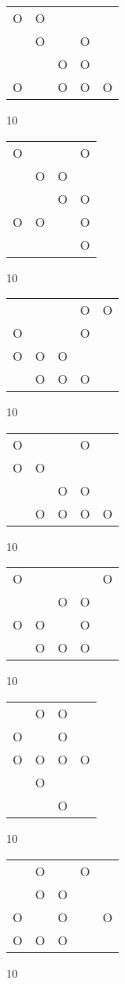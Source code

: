 \begin{tabular}{|m{0.2cm}m{0.2cm}m{0.2cm}m{0.2cm}m{0.2cm}|}\hline
O&O& & & \\
 &O& &O& \\
 & &O&O& \\
O& &O&O&O\\
\hline\end{tabular}10
\begin{tabular}{|m{0.2cm}m{0.2cm}m{0.2cm}m{0.2cm}|}\hline
O& & &O\\
 &O&O& \\
 & &O&O\\
O&O& &O\\
 & & &O\\
\hline\end{tabular}10
\begin{tabular}{|m{0.2cm}m{0.2cm}m{0.2cm}m{0.2cm}m{0.2cm}|}\hline
 & & &O&O\\
O& & &O& \\
O&O&O& & \\
 &O&O&O& \\
\hline\end{tabular}10
\begin{tabular}{|m{0.2cm}m{0.2cm}m{0.2cm}m{0.2cm}m{0.2cm}|}\hline
O& & &O& \\
O&O& & & \\
 & &O&O& \\
 &O&O&O&O\\
\hline\end{tabular}10
\begin{tabular}{|m{0.2cm}m{0.2cm}m{0.2cm}m{0.2cm}m{0.2cm}|}\hline
O& & & &O\\
 & &O&O& \\
O&O& &O& \\
 &O&O&O& \\
\hline\end{tabular}10
\begin{tabular}{|m{0.2cm}m{0.2cm}m{0.2cm}m{0.2cm}|}\hline
 &O&O& \\
O& &O& \\
O&O&O&O\\
 &O& & \\
 & &O& \\
\hline\end{tabular}10
\begin{tabular}{|m{0.2cm}m{0.2cm}m{0.2cm}m{0.2cm}m{0.2cm}|}\hline
 &O& &O& \\
 &O&O& & \\
O& &O& &O\\
O&O&O& & \\
\hline\end{tabular}10
